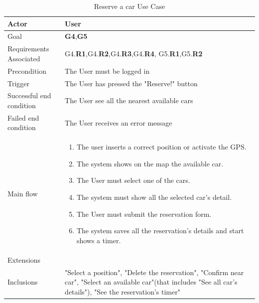 \newline
\begin{table}[htb]
\begin{center}
\renewcommand{\arraystretch}{1.5}
\begin{tabular}{|l|p{}|}
\hline
Actor & User \\ \hline
Goal & \textbf{G4},\textbf{G5} \\ \hline
Requirements Associated & G4.\textbf{R1},G4.\textbf{R2},G4.\textbf{R3},G4.\textbf{R4}, G5.\textbf{R1},G5.\textbf{R2} \\ \hline
Precondition & The User must be logged in \\ \hline
Trigger & The User has pressed the "Reserve!" button \\ \hline
Successful end condition & The User see all the nearest available cars \\ \hline
Failed end condition & The User receives an error message \\ \hline
Main flow & \begin{minipage}[t]{0.6\textwidth}
\begin{enumerate}
\addtolength{\itemindent}{0.5cm}
\item The user inserts a correct position or activate the GPS.
\item The system shows on the map the available car.
\item The User must select one of the cars.
\item The system must show all the selected car's detail.
\item The User must submit the reservation form.
\item The system saves all the reservation's details and start shows a timer. 
\vspace{2,5mm}
\end{enumerate}
\end{minipage} \\ \hline
Extensions & \\ \hline
Inclusions & "Select a position", "Delete the reservation", "Confirm near car", "Select an available car"(that includes "See all car's details"), "See the reservation's timer" \\ \hline
\end{tabular}
\caption{Reserve a car Use Case}
\end{center}
\end{table}
\clearpage

